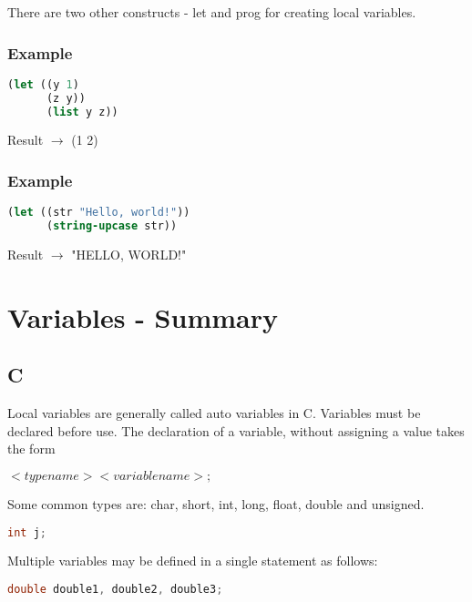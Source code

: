 \documentclass[12pt]{book}
\begin{document}
There are two other constructs - let and prog for creating local variables.


\subsubsection{Example}


\lstset{style=mystyle}
\begin{lstlisting}[language=Lisp, caption=Lisp example]
(let ((y 1)
      (z y))
      (list y z))
\end{lstlisting}

Result  $\to$ (1 2)

             
\subsubsection{Example}


\lstset{style=mystyle}
\begin{lstlisting}[language=Lisp, caption=Lisp example]
(let ((str "Hello, world!"))
      (string-upcase str))
\end{lstlisting}

Result $\to$ "HELLO, WORLD!"


\newpage

\section{Variables - Summary}

\subsection{C}

Local variables are generally called auto variables in C. Variables must be declared before use. The declaration of a variable, without assigning a value takes the form

$<typename> <variablename>;$

Some common types are: char, short, int, long, float, double and unsigned.

\lstset{style=mystyle}
\begin{lstlisting}[language=C, caption=C example]
int j;
\end{lstlisting}

Multiple variables may be defined in a single statement as follows:

\lstset{style=mystyle}
\begin{lstlisting}[language=C, caption=C example]
double double1, double2, double3;
\end{lstlisting}
\end{document}
